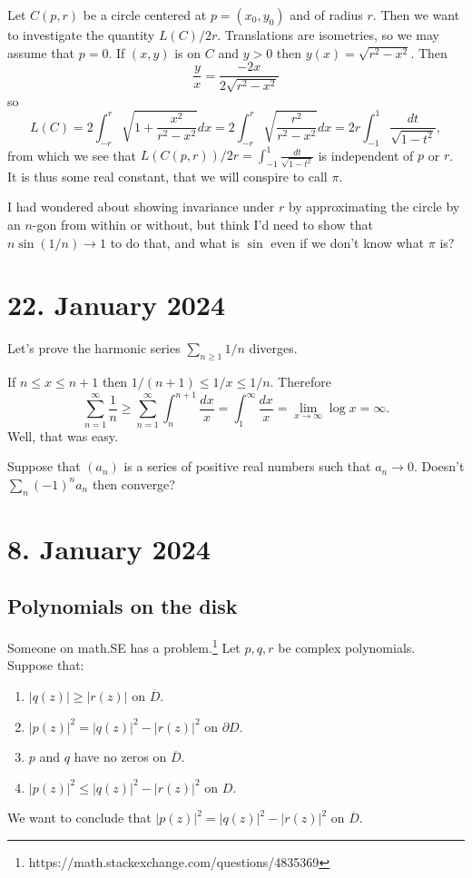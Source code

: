 \documentclass[11pt]{amsart}
\theoremstyle{definition}
\def\ov#1{\overline{#1}}
\begin{document}
Let $C(p, r)$ be a circle centered at $p = (x_0, y_0)$ and of radius $r$.
Then we want to investigate the quantity $L(C) / 2r$.
Translations are isometries, so we may assume that $p = 0$.
If $(x,y)$ is on $C$ and $y > 0$ then $y(x) = \sqrt{r^2 - x^2}$.
Then
$$
\frac{y}{x} = \frac{-2x}{2\sqrt{r^2 - x^2}}
$$
so
$$
L(C) = 2 \int_{-r}^r \sqrt{1 + \frac{x^2}{r^2 - x^2}} dx
= 2 \int_{-r}^r \sqrt{\frac{r^2}{r^2 - x^2}} dx
= 2r \int_{-1}^1 \frac{dt}{\sqrt{1 - t^2}},
$$
from which we see that $L(C(p,r)) / 2r = \int_{-1}^1 \frac{dt}{\sqrt{1 - t^2}}$
is independent of $p$ or $r$.
It is thus some real constant, that we will conspire to call $\pi$.

I had wondered about showing invariance under $r$ by approximating the circle
by an $n$-gon from within or without, but think I'd need to show that
$n \sin(1/n) \to 1$ to do that, and what is $\sin$ even if we don't know what
$\pi$ is?


\section{22. January 2024}

Let's prove the harmonic series $\sum_{n \geq 1} 1/n$ diverges.

If $n \leq x \leq n+1$ then $1/(n+1) \leq 1/x \leq 1/n$.
Therefore
$$
\sum_{n = 1}^\infty \frac 1n
\geq \sum_{n=1}^\infty \int_n^{n+1} \frac{dx}{x}
= \int_1^\infty \frac{dx}{x}
= \lim_{x \to \infty} \log x
= \infty.
$$
Well, that was easy.


Suppose that $(a_n)$ is a series of positive real numbers such that $a_n \to 0$.
Doesn't $\sum_n (-1)^n a_n$ then converge?


\section{8. January 2024}

\subsection*{Polynomials on the disk}

Someone on math.SE has a problem.\footnote{https://math.stackexchange.com/questions/4835369}
Let $p,q,r$ be complex polynomials.
Suppose that:
\begin{enumerate}
\item
$|q(z)| \geq |r(z)|$ on $\ov{D}$.

\item
$|p(z)|^2 = |q(z)|^2 - |r(z)|^2$ on $\partial D$.

\item
$p$ and $q$ have no zeros on $\ov{D}$.

\item
$|p(z)|^2 \leq |q(z)|^2 - |r(z)|^2$ on $D$.
\end{enumerate}
We want to conclude that $|p(z)|^2 = |q(z)|^2 - |r(z)|^2$ on $\ov{D}$.
\end{document}
